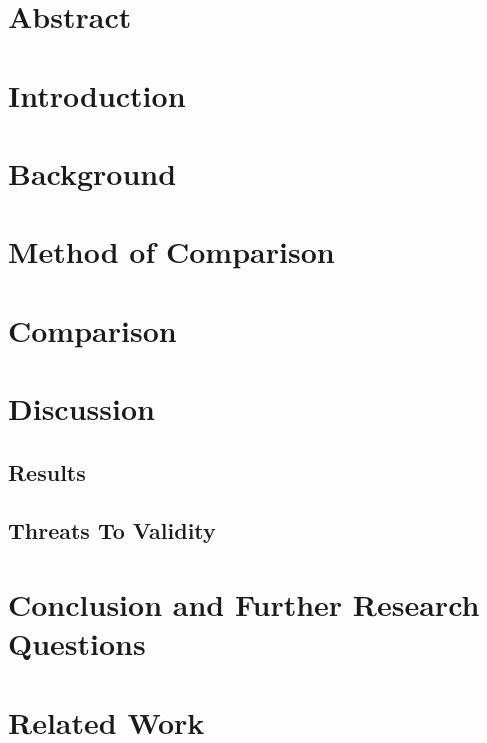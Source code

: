 \documentclass[english]{mluthesis} %
\begin{document}
\maketitle

\pagebreak
\tableofcontents

\pagebreak
\chapter*{Abstract}
\lipsum[2-3]

\chapter{Introduction}
\lipsum[5-7]

\chapter{Background}
\lipsum[7-8]

\chapter{Method of Comparison}
\lipsum[5-7]

\chapter{Comparison}
\lipsum[13-15]

\chapter{Discussion}
\lipsum[5-6]

\section{Results}
\lipsum[5-6]

\section{Threats To Validity}
\lipsum[4-5]

\chapter{Conclusion and Further Research Questions}
\lipsum[7-10]

\chapter{Related Work}
\lipsum[5-7]

\nocite{*}


\declaration
\end{document}
